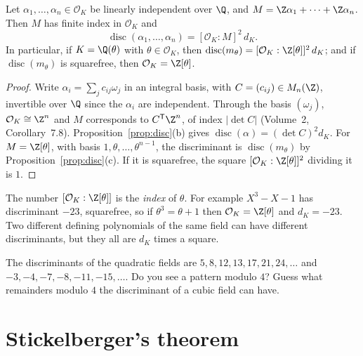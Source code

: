 \begin{proposition}\label{prop:index}
Let $\alpha_1,\dots,\alpha_n\in\mathcal O_K$ be linearly independent over $\Q$, and $M=\Z\alpha_1+\dots+\Z\alpha_n$.
Then $M$ has finite index in $\mathcal O_K$ and
\[
\operatorname{disc}(\alpha_1,\dots,\alpha_n)=[\mathcal O_K:M]^2\,d_K.
\]
In particular, if $K=\Q(\theta)$ with $\theta\in\mathcal O_K$, then $\operatorname{disc}(m_\theta)=
[\mathcal O_K:\Z[\theta]]^2\,d_K$; and if $\operatorname{disc}(m_\theta)$ is squarefree, then
$\mathcal O_K=\Z[\theta]$.
\end{proposition}
\begin{proof}
Write $\alpha_i=\sum_jc_{ij}\omega_j$ in an integral basis, with $C=(c_{ij})\in M_n(\Z)$, invertible over $\Q$ since the
$\alpha_i$ are independent. Through the basis $(\omega_j)$, $\mathcal O_K\cong\Z^n$ and $M$ corresponds to
$C^{\mathsf T}\Z^n$, of index $|\det C|$ (Volume~2, Corollary~7.8). Proposition~\ref{prop:disc}(b) gives
$\operatorname{disc}(\alpha)=(\det C)^2d_K$. For $M=\Z[\theta]$, with basis $1,\theta,\dots,\theta^{n-1}$, the discriminant
is $\operatorname{disc}(m_\theta)$ by Proposition~\ref{prop:disc}(c). If it is squarefree, the square
$[\mathcal O_K:\Z[\theta]]^2$ dividing it is $1$.
\end{proof}

The number $[\mathcal O_K:\Z[\theta]]$ is the \emph{index} of $\theta$. For example $X^3-X-1$ has discriminant $-23$,
squarefree, so if $\theta^3=\theta+1$ then $\mathcal O_K=\Z[\theta]$ and $d_K=-23$. Two different defining polynomials
of the same field can have different discriminants, but they all are $d_K$ times a square.

\begin{think}
The discriminants of the quadratic fields are $5, 8, 12, 13, 17, 21, 24, \dots$ and $-3,-4,-7,-8,-11,-15,\dots$. Do you
see a pattern modulo $4$? Guess what remainders modulo $4$ the discriminant of a cubic field can have.
\end{think}

\section{Stickelberger's theorem}

